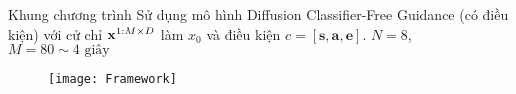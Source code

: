 \begin{frame}{Khung chương trình}
	Sử dụng mô hình Diffusion Classifier-Free Guidance (có điều kiện) với cử chỉ $\mathbf{x}^{1:M \times D}$ làm $x_0$ và điều kiện $c = [{\mathbf{s}, \mathbf{a}, \mathbf{e}}]$. $N = 8$, $M = 80 \sim \text{4 giây}$
	\vspace{-15pt}
		\begin{figure}[h]
			\centering
			\texttt{[image: Framework]}
		\end{figure}
	
%
%

\end{frame}




